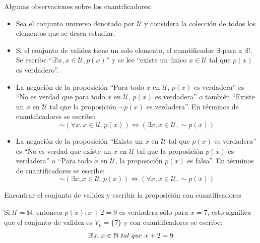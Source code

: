 \newpage
Algunas observaciones sobre los cuantificadores:
\begin{itemize}
\item Sea el conjunto universo denotado por $\mathcal{U}$ y considera la colección de todos los elementos que se desea estudiar.
	
\item Si el conjunto de validez tiene un solo elemento, el cuantificador $\exists$ pasa a $\exists!$. Se escribe ``$\exists! x, x\in\mathcal{U},p(x)$'' y se lee ``existe un único $x\in\mathcal{U}$ tal que $p(x)$ es verdadero''.
	
\item La negación de la proposición  ``Para todo $x$ en $\mathcal{U}$, $p(x)$ es verdadera'' es ``No es verdad que para todo $x$ en $\mathcal{U}$, $p(x)$ es verdadera'' o también ``Existe un $x$ en $\mathcal{U}$ tal que la proposición $\sim p(x)$ es verdadera''. En términos de cuantificadores se escribe:
	\begin{equation}
	\sim(\forall x,x\in\mathcal{U},p(x))\Leftrightarrow(\exists x,x\in\mathcal{U},\sim p(x))
	\end{equation}
	
\item La negación de la proposición ``Existe un $x$ en $\mathcal{U}$ tal que $p(x)$ es verdadera'' es ``No es verdad que existe un $x$  en $\mathcal{U}$ tal que la proposición $p(x)$ es verdadera'' o ``Para todo $x$ en $\mathcal{U}$, la proposición $p(x)$ es falsa''. En términos de cuantificadores se escribe:
	\begin{equation}
	\sim(\exists x,x\in\mathcal{U},p(x))\Leftrightarrow(\forall x,x\in\mathcal{U},\sim p(x))
	\end{equation}

\end{itemize}
	
\begin{myexample}
Encontrar el conjunto de validez y escribir la proposición con cuantificadores
\end{myexample}
Si $\mathcal{U}=\mathbb{N}$, entonces $p(x):x+2=9$ es verdadera sólo para $x=7$, esto significa que el conjunto de validez es $V_{p}=\{7\}$ y con cuantificadores se escribe:
\begin{equation}
\exists!x,x\in\mathbb{N}\hspace{3px}tal\hspace{3px}que\hspace{3px}x+2=9
\end{equation}

